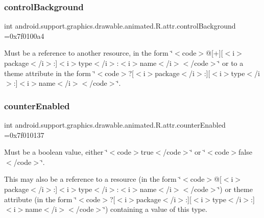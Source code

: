 \subsubsection{\texorpdfstring{control\+Background}{controlBackground}}
{\footnotesize\ttfamily int android.\+support.\+graphics.\+drawable.\+animated.\+R.\+attr.\+control\+Background =0x7f0100a4\hspace{0.3cm}{\ttfamily [static]}}

Must be a reference to another resource, in the form \char`\"{}$<$code$>$@\mbox{[}+\mbox{]}\mbox{[}$<$i$>$package$<$/i$>$\+:\mbox{]}$<$i$>$type$<$/i$>$\+:$<$i$>$name$<$/i$>$$<$/code$>$\char`\"{} or to a theme attribute in the form \char`\"{}$<$code$>$?\mbox{[}$<$i$>$package$<$/i$>$\+:\mbox{]}\mbox{[}$<$i$>$type$<$/i$>$\+:\mbox{]}$<$i$>$name$<$/i$>$$<$/code$>$\char`\"{}. \mbox{\label{classandroid_1_1support_1_1graphics_1_1drawable_1_1animated_1_1R_1_1attr_a2e6bb6a01155188919823ebb2059e78f}} 
\subsubsection{\texorpdfstring{counter\+Enabled}{counterEnabled}}
{\footnotesize\ttfamily int android.\+support.\+graphics.\+drawable.\+animated.\+R.\+attr.\+counter\+Enabled =0x7f010137\hspace{0.3cm}{\ttfamily [static]}}

Must be a boolean value, either \char`\"{}$<$code$>$true$<$/code$>$\char`\"{} or \char`\"{}$<$code$>$false$<$/code$>$\char`\"{}. 

This may also be a reference to a resource (in the form \char`\"{}$<$code$>$@\mbox{[}$<$i$>$package$<$/i$>$\+:\mbox{]}$<$i$>$type$<$/i$>$\+:$<$i$>$name$<$/i$>$$<$/code$>$\char`\"{}) or theme attribute (in the form \char`\"{}$<$code$>$?\mbox{[}$<$i$>$package$<$/i$>$\+:\mbox{]}\mbox{[}$<$i$>$type$<$/i$>$\+:\mbox{]}$<$i$>$name$<$/i$>$$<$/code$>$\char`\"{}) containing a value of this type. \mbox{\label{classandroid_1_1support_1_1graphics_1_1drawable_1_1animated_1_1R_1_1attr_a868ab6af84f6bd2609b356ab8558f4c0}} 
